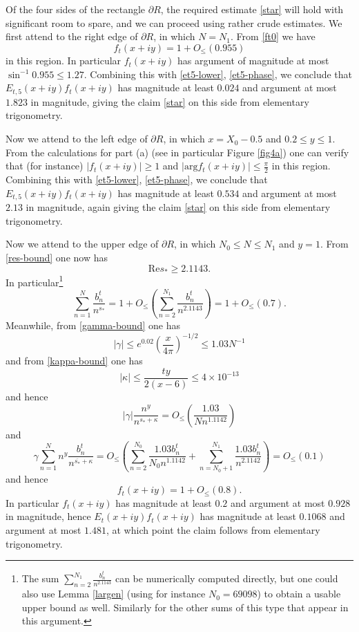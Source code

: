 Of the four sides of the rectangle $\partial R$, the required estimate \eqref{star} will hold with significant room to spare, and we can proceed using rather crude estimates.  We first attend to the right edge of $\partial R$, in which $N = N_1$.  
From \eqref{ft0} we have
$$
f_t(x+iy) = 1 + O_{\leq}( 0.955 )$$
in this region.  In particular $f_t(x+iy)$ has argument of magnitude at most $\sin^{-1} 0.955 \leq 1.27$.  Combining this with \eqref{et5-lower}, \eqref{et5-phase}, we conclude that $E_{t,5}(x+iy) f_t(x+iy)$ has magnitude at least $0.024$ and argument at most $1.823$ in magnitude, giving the claim \eqref{star} on this side from elementary trigonometry.

Now we attend to the left edge of $\partial R$, in which $x = X_0 - 0.5$ and $0.2 \leq y \leq 1$.  From the calculations for part (a) (see in particular Figure \ref{fig4a}) one can verify that (for instance) $|f_t(x+iy)| \geq 1$ and $|\mathrm{arg} f_t(x+iy)| \leq \frac{\pi}{2}$ in this region.  Combining this with \eqref{et5-lower}, \eqref{et5-phase}, we conclude that $E_{t,5}(x+iy) f_t(x+iy)$ has magnitude at least $0.534$ and argument at most $2.13$ in magnitude, again giving the claim \eqref{star} on this side from elementary trigonometry.

Now we attend to the upper edge of $\partial R$, in which $N_0 \leq N \leq N_1$ and $y=1$.  From \eqref{res-bound} one now has
$$ \mathrm{Re} s_* \geq 2.1143.$$
In particular\footnote{The sum $\sum_{n=2}^{N_1} \frac{b_n^t}{n^{2.1143}}$ can be numerically computed directly, but one could also use Lemma \ref{largen} (using for instance $N_0 = 69098$) to obtain a usable upper bound as well.  Similarly for the other sums of this type that appear in this argument.}
$$ \sum_{n=1}^N \frac{b_n^t}{n^{s_*}} = 1 + O_{\leq}\left( \sum_{n=2}^{N_1} \frac{b_n^t}{n^{2.1143}} \right) = 1 + O_{\leq}( 0.7 ).$$
Meanwhile, from \eqref{gamma-bound} one has
$$ |\gamma| \leq e^{0.02} \left( \frac{x}{4\pi} \right)^{-1/2} \leq 1.03 N^{-1}$$
and from \eqref{kappa-bound} one has
$$ |\kappa| \leq \frac{ty}{2(x-6)} \leq 4 \times 10^{-13}$$
and hence
$$ |\gamma| \frac{n^y}{n^{s_* + \kappa}} = O_{\leq}( \frac{1.03}{N n^{1.1142}} )$$
and
$$   \gamma \sum_{n=1}^N n^y \frac{b_n^t}{n^{\overline{s_*} + \kappa}} = O_{\leq}\left( \sum_{n=2}^{N_0} \frac{1.03 b_n^t}{N_0 n^{1.1142}} + \sum_{n=N_0+1}^{N_1} \frac{1.03 b_n^t}{n^{2.1142}} \right) = O_{\leq}( 0.1 )$$
and hence
$$ f_t(x+iy) = 1 + O_{\leq}(0.8).$$
In particular $f_t(x+iy)$ has magnitude at least $0.2$ and argument at most $0.928$ in magnitude, hence $E_t(x+iy) f_t(x+iy)$ has magnitude at least $0.1068$ and argument at most $1.481$, at which point the claim follows from elementary trigonometry.

